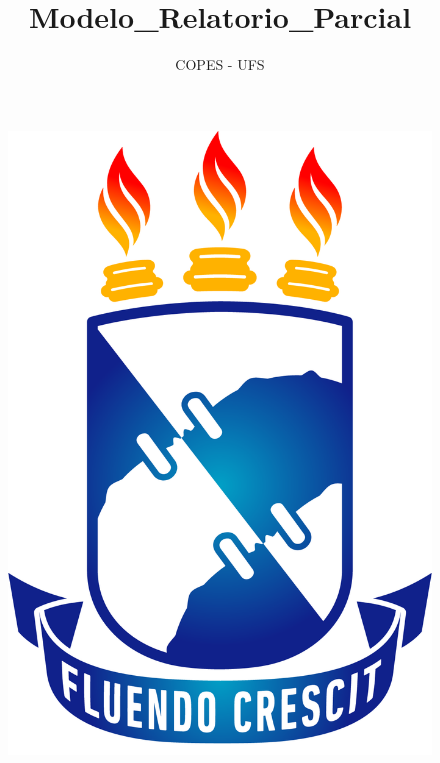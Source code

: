 \documentclass[12pt, a4paper]{article}
\author{COPES - UFS}
\title{Modelo_Relatorio_Parcial}
\date{}
\begin{document}
\begin{figure}[!h]
    \centering
    \includegraphics[scale=0.2]{recorte.png}

  \end{figure}
\end{document}
